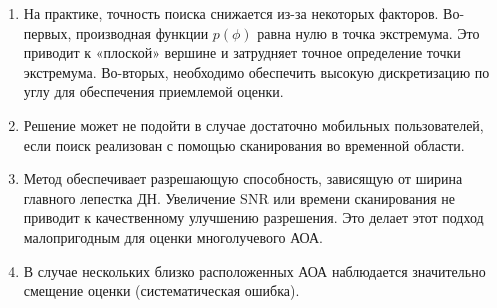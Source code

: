\begin{enumerate}

\item На практике, точность поиска снижается из-за некоторых факторов.
    Во-первых, производная функции $p(\phi)$ равна нулю в
         точка экстремума. Это приводит к «плоской» вершине и затрудняет точное
         определение точки экстремума. Во-вторых, необходимо обеспечить
         высокую дискретизацию по углу для обеспечения приемлемой оценки.
     \item Решение может не подойти в случае достаточно мобильных пользователей, если
         поиск реализован с помощью сканирования во временной области.
     \item Метод обеспечивает разрешающую способность, зависящую
         от ширина главного лепестка ДН. Увеличение SNR или времени
         сканирования не приводит к качественному улучшению разрешения.  Это делает
         этот подход малопригодным для оценки многолучевого АОА.
     \item В случае нескольких близко расположенных АОА наблюдается
         значительно смещение оценки (систематическая ошибка).
\end{enumerate}


